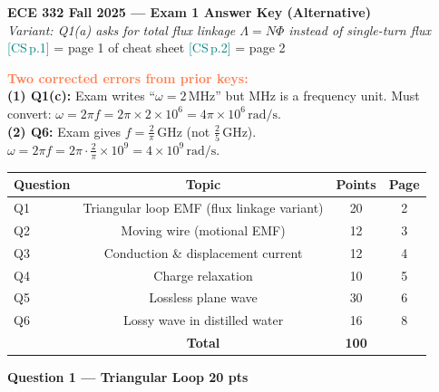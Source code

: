 \documentclass[11pt,letterpaper]{article}
\begin{document}
\begin{center}
{\Large\textbf{ECE 332 Fall 2025 --- Exam 1 Answer Key (Alternative)}}\\[4pt]
{\normalsize\textit{Variant: Q1(a) asks for total flux linkage $\Lambda=N\Phi$ instead of single-turn flux}}\\[6pt]
{\small\textcolor{teal}{[CS\,p.1]} = page 1 of cheat sheet \quad
       \textcolor{teal}{[CS\,p.2]} = page 2}
\end{center}

\vspace{4pt}
\begin{notebox}
\textbf{\textcolor{coral}{Two corrected errors from prior keys:}}\\[2pt]
\textbf{(1) Q1(c):} Exam writes ``$\omega=2\,\text{MHz}$'' but MHz is a frequency unit.
Must convert: $\omega=2\pi f=2\pi\times2\times10^6=4\pi\times10^6\,\text{rad/s}$.\\[2pt]
\textbf{(2) Q6:} Exam gives $f=\tfrac{2}{\pi}\,\text{GHz}$ (not $\tfrac{2}{5}$\,GHz).
$\omega=2\pi f=2\pi\cdot\tfrac{2}{\pi}\times10^9=4\times10^9\,\text{rad/s}$.
\end{notebox}

\vspace{6pt}
\begin{center}
\renewcommand{\arraystretch}{1.3}
\begin{tabular}{@{}lccc@{}}
\toprule
Question & Topic & Points & Page\\
\midrule
Q1 & Triangular loop EMF (flux linkage variant) & 20 & 2\\
Q2 & Moving wire (motional EMF) & 12 & 3\\
Q3 & Conduction \& displacement current & 12 & 4\\
Q4 & Charge relaxation & 10 & 5\\
Q5 & Lossless plane wave & 30 & 6\\
Q6 & Lossy wave in distilled water & 16 & 8\\
\midrule
 & \textbf{Total} & \textbf{100} &\\
\bottomrule
\end{tabular}
\end{center}

\newpage
\colorbox{purplebg}{\parbox{\dimexpr\linewidth-2\fboxsep}{\color{purple}\large\textbf{Question 1 --- Triangular Loop \hfill 20 pts}}}
\end{document}
